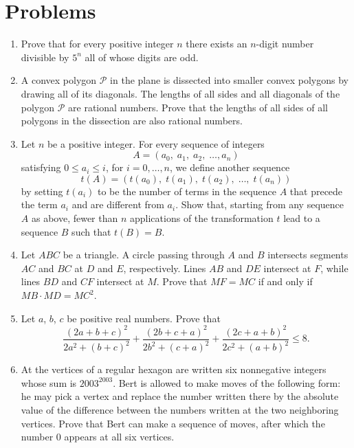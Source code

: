 \documentclass[11pt]{scrartcl}
\begin{document}
\section{Problems}
\begin{enumerate}[\bfseries 1.]
\item %
Prove that for every positive integer $n$
there exists an $n$-digit number divisible by $5^n$
all of whose digits are odd.

\item %
A convex polygon $\mathcal{P}$ in the plane
is dissected into smaller convex polygons by
drawing all of its diagonals.
The lengths of all sides and all diagonals of the
polygon $\mathcal{P}$ are rational numbers.
Prove that the lengths of all sides of all polygons
in the dissection are also rational numbers.

\item %
Let $n$ be a positive integer.
For every sequence of integers
\[ A = (a_0, \; a_1, \; a_2, \; \dots, a_n) \]
satisfying $0 \le a_i \le i$, for $i=0,\dots,n$,
we define another sequence
\[ t(A)= (t(a_0), \; t(a_1), \; t(a_2), \; \dots, \; t(a_n)) \]
by setting $t(a_i)$ to be the number of terms in the
sequence $A$ that precede the term $a_i$ and are different from $a_i$.
Show that, starting from any sequence $A$ as above,
fewer than $n$ applications of the  transformation $t$
lead to a sequence $B$ such that $t(B) = B$.

\item %
Let $ABC$ be a triangle.
A circle passing through $A$ and $B$
intersects segments $AC$ and $BC$ at $D$ and $E$, respectively.
Lines $AB$ and $DE$ intersect at $F$,
while lines $BD$ and $CF$ intersect at $M$.
Prove that $MF = MC$ if and only if $MB \cdot MD = MC^2$.

\item %
Let $a$, $b$, $c$ be positive real numbers.
Prove that
\[ \frac{(2a+b+c)^2}{2a^2+(b+c)^2}
+ \frac{(2b+c+a)^2}{2b^2+(c+a)^2}
+ \frac{(2c+a+b)^2}{2c^2+(a+b)^2} \le 8.  \]

\item %
At the vertices of a regular hexagon are written six nonnegative integers
whose sum is $2003^{2003}$.
Bert is allowed to make moves of the following form:
he may pick a vertex and replace the number written
there by the absolute value of the difference between the numbers
written at the two neighboring vertices.
Prove that Bert can make a sequence of moves,
after which the number $0$ appears at all six vertices.

\end{enumerate}
\pagebreak
\end{document}
